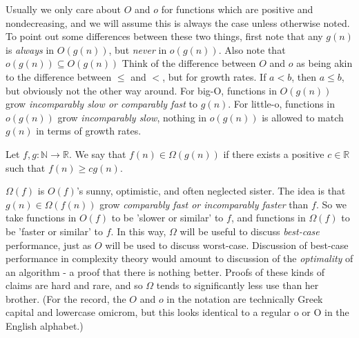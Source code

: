 Usually we only care about $O$ and $o$ for functions which are positive and nondecreasing, and we will assume this is always the case unless otherwise noted. To point out some differences between these two things, first note that any $g(n)$ is \textit{always} in $O(g(n))$, but \textit{never} in $o(g(n))$. Also note that $o(g(n)) \subseteq O(g(n))$ Think of the difference between $O$ and $o$ as being akin to the difference between $\leq$ and $<$, but for growth rates. If $a < b$, then $a \leq b$, but obviously not the other way around. For big-O, functions in $O(g(n))$ grow \textit{incomparably slow or comparably fast} to $g(n)$. For little-o, functions in $o(g(n))$ grow \textit{incomparably slow}, nothing in $o(g(n))$ is allowed to match $g(n)$ in terms of growth rates.

\begin{definition}
	Let $f,g: \mathbb{N} \to \mathbb{R}$. We say that $f(n) \in \Omega(g(n))$ if there exists a positive $c \in \mathbb{R}$ such that $f(n) \geq cg(n)$.  
\end{definition} 

$\Omega(f)$ is $O(f)$'s sunny, optimistic, and often neglected sister. The idea is that $g(n) \in \Omega(f(n))$ grow \textit{comparably fast or incomparably faster} than $f$. So we take functions in $O(f)$ to be 'slower or similar' to $f$, and functions in $\Omega(f)$ to be 'faster or similar' to $f$. In this way, $\Omega$ will be useful to discuss \textit{best-case} performance, just as $O$ will be used to discuss worst-case. Discussion of best-case performance in complexity theory would amount to discussion of the \textit{optimality} of an algorithm - a proof that there is nothing better. Proofs of these kinds of claims are hard and rare, and so $\Omega$ tends to significantly less use than her brother. (For the record, the $O$ and $o$ in the notation are technically Greek capital and lowercase omicrom, but this looks identical to a regular o or O in the English alphabet.)

